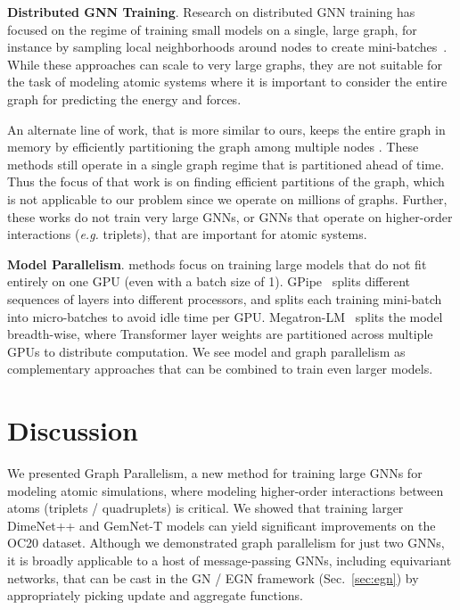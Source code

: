 \documentclass{article} \usepackage{iclr2022_conference,times}
\begin{document}
\textbf{Distributed GNN Training}.
Research on distributed GNN training has focused on the regime of training small models on a single, large graph, for instance
by sampling local neighborhoods around nodes to create mini-batches~\citep{jangda2021accelerating,zhang2020agl,zhu2019aligraph}.
While these approaches can scale to very large graphs,
they are not suitable for the task of modeling atomic systems where it is important to consider the entire graph for predicting the energy and forces.

An alternate line of work, that is more similar to ours, keeps the entire graph in memory by efficiently partitioning the graph among multiple nodes \citep{Jia2020ImprovingTA,Ma2019NeuGraphPD,tripathy2020reducing}. These methods still operate in a single graph regime that is partitioned ahead of time. Thus the focus of that work is on finding efficient partitions of the graph, which is not applicable to our problem since we operate on millions of graphs.
Further, these works do not train very large GNNs, or GNNs that operate on higher-order interactions (\textit{e.g.} triplets), that are important for atomic systems.


\textbf{Model Parallelism}.
methods focus on training large models that do not fit entirely on one GPU (even with a batch size of 1).
GPipe~\citep{huang2019gpipe} splits different sequences of layers into different processors, and splits each training mini-batch into micro-batches to avoid idle time per GPU.
Megatron-LM~\citep{shoeybi2020megatronlm} splits the model breadth-wise, where Transformer layer weights are partitioned
across multiple GPUs to distribute computation.
We see model and graph parallelism as complementary approaches that can be combined to train even larger models.
\section{Discussion}
We presented Graph Parallelism, a new method for training large GNNs for modeling atomic
simulations, where modeling higher-order interactions between atoms (triplets / quadruplets) is critical.
We showed that training larger DimeNet++ and GemNet-T models can yield significant improvements on the OC20 dataset.
Although we demonstrated graph parallelism for just two GNNs, it is broadly applicable to a host of message-passing GNNs, including equivariant networks,
that can be cast in the GN / EGN framework (Sec.~\ref{sec:egn}) by appropriately picking update and aggregate functions.
\end{document}
